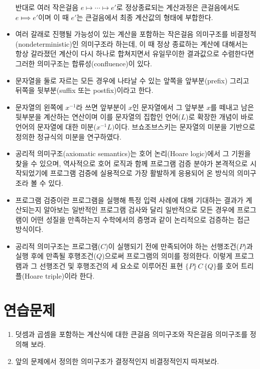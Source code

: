 \begin{itemize}
       반대로 여러 작은걸음 $e\longmapsto \cdots \longmapsto e'$로
       정상종료되는 계산과정은 큰걸음에서도 $e\Longmapsto e'$이며 이 때
       $e'$는 큰걸음에서 최종 계산값의 형태에 부합한다.
 \item 여러 갈래로 진행될 가능성이 있는 계산을 포함하는 작은걸음 의미구조를
       비결정적(nondeterministic)인 의미구조라 하는데, 이 때 정상 종료하는
       계산에 대해서는 항상 갈라졌던 계산이 다시 하나로 합쳐지면서 유일무이한
       결과값으로 수렴한다면 그러한 의미구조는 합류성(confluence)이 있다.
 \item 문자열을 둘로 자르는 모든 경우에 나타날 수 있는 앞쪽을 앞부분(prefix)
       그리고 뒤쪽을 뒷부분(suffix 또는 postfix)이라고 한다.
 \item 문자열의 왼쪽에 $x^{-1}$라 쓰면 앞부분이 $x$인 문자열에서 그 앞부분 $x$를
       떼내고 남은 뒷부분을 계산하는 연산이며 이를 문자열의 집합인 언어($L$)로
       확장한 개념이 바로 언어의 문자열에 대한 미분($x^{-1} L)$이다.
       브쇼조브스키는 문자열의 미분을 기반으로 정의한 정규식의 미분을 연구하였다.
 \item 공리적 의미구조(axiomatic semantics)는 호어 논리(Hoare logic)에서
       그 기원을 찾을 수 있으며, 역사적으로 호어 로직과 함께 프로그램
       검증 분야가 본격적으로 시작되었기에 프로그램 검증에 실용적으로
       가장 활발하게 응용되어 온 방식의 의미구조라 볼 수 있다.
 \item 프로그램 검증이란 프로그램을 실행해 특정 입력 사례에 대해 기대하는
       결과가 계산되는지 알아보는 일반적인 프로그램 검사와 달리 일반적으로
       모든 경우에 프로그램이 어떤 성질을 만족하는지 수학에서의 증명과 같이
       논리적으로 검증하는 접근 방식이다.
 \item 공리적 의미구조는 프로그램($C$)이 실행되기 전에 만족되어야 하는
       선행조건($P$)과 실행 후에 만족될 후행조건($Q$)으로써 프로그램의
       의미를 정의한다. 이렇게 프로그램과 그 선행조건 및 후행조건의
       세 요소로 이루어진 표현 $\{P\}\,C\,\{Q\}$를
       호어 트리플(Hoare triple)이라 한다.
\end{itemize}

\section*{연습문제}
\begin{enumerate}
 \item 덧셈과 곱셈을 포함하는 계산식에 대한
       큰걸음 의미구조와 작은걸음 의미구조를 정의해 보라.
 \item 앞의 문제에서 정의한 의미구조가 결정적인지 비결정적인지 따져보라.
\end{enumerate}

